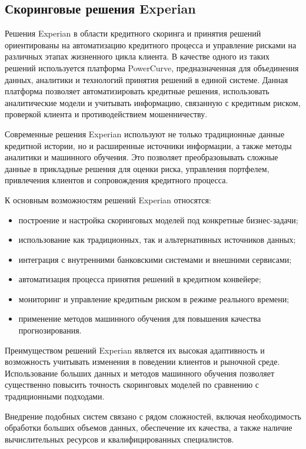 \subsection{Скоринговые решения Experian}

Решения Experian в области кредитного скоринга и принятия решений ориентированы на автоматизацию кредитного процесса и управление рисками на различных этапах жизненного цикла клиента. В качестве одного из таких решений используется платформа PowerCurve, предназначенная для объединения данных, аналитики и технологий принятия решений в единой системе. Данная платформа позволяет автоматизировать кредитные решения, использовать аналитические модели и учитывать информацию, связанную с кредитным риском, проверкой клиента и противодействием мошенничеству.

Современные решения Experian используют не только традиционные данные кредитной истории, но и расширенные источники информации, а также методы аналитики и машинного обучения. Это позволяет преобразовывать сложные данные в прикладные решения для оценки риска, управления портфелем, привлечения клиентов и сопровождения кредитного процесса.

К основным возможностям решений Experian относятся:

\begin{itemize}
  \item построение и настройка скоринговых моделей под конкретные бизнес-задачи;
  \item использование как традиционных, так и альтернативных источников данных;
  \item интеграция с внутренними банковскими системами и внешними сервисами;
  \item автоматизация процесса принятия решений в кредитном конвейере;
  \item мониторинг и управление кредитным риском в режиме реального времени;
  \item применение методов машинного обучения для повышения качества прогнозирования.
\end{itemize}

Преимуществом решений Experian является их высокая адаптивность и возможность учитывать изменения в поведении клиентов и рыночной среде. Использование больших данных и методов машинного обучения позволяет существенно повысить точность скоринговых моделей по сравнению с традиционными подходами.

Внедрение подобных систем связано с рядом сложностей, включая необходимость обработки больших объемов данных, обеспечение их качества, а также наличие вычислительных ресурсов и квалифицированных специалистов.

